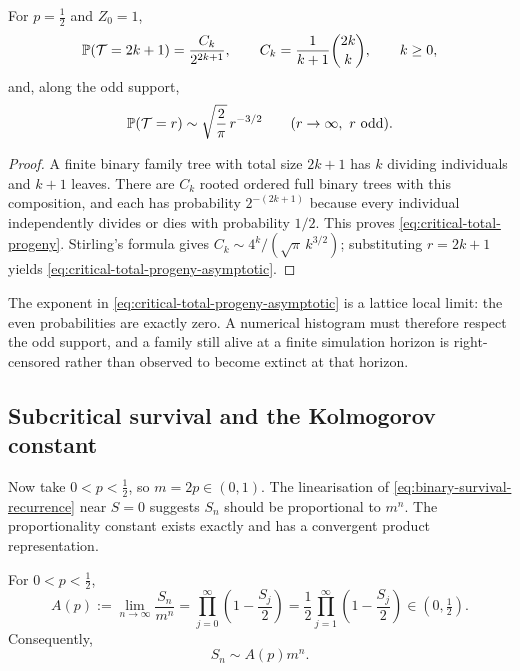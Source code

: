 \begin{proposition}
For $p=\tfrac12$ and $Z_0=1$,
\begin{equation}
  \mathbb{P}(\mathcal{T}=2k+1)
  =\frac{C_k}{2^{2k+1}},
  \qquad
  C_k=\frac{1}{k+1}\binom{2k}{k},
  \qquad k\ge0,
  \label{eq:critical-total-progeny}
\end{equation}
and, along the odd support,
\begin{equation}
  \mathbb{P}(\mathcal{T}=r)
  \sim \sqrt{\frac{2}{\pi}}\,r^{-3/2}
  \qquad (r\to\infty,\ r\text{ odd}).
  \label{eq:critical-total-progeny-asymptotic}
\end{equation}
\end{proposition}

\begin{proof}
A finite binary family tree with total size $2k+1$ has $k$ dividing individuals and $k+1$ leaves.  There are $C_k$ rooted ordered full binary trees with this composition, and each has probability $2^{-(2k+1)}$ because every individual independently divides or dies with probability $1/2$.  This proves \cref{eq:critical-total-progeny}.  Stirling's formula gives $C_k\sim4^k/(\sqrt{\pi}\,k^{3/2})$; substituting $r=2k+1$ yields \cref{eq:critical-total-progeny-asymptotic}.
\end{proof}

The exponent in \cref{eq:critical-total-progeny-asymptotic} is a lattice local limit: the even probabilities are exactly zero.  A numerical histogram must therefore respect the odd support, and a family still alive at a finite simulation horizon is right-censored rather than observed to become extinct at that horizon.

\subsection{Subcritical survival and the Kolmogorov constant}
\label{sec:kolmogorov-constant}

Now take $0<p<\tfrac12$, so $m=2p\in(0,1)$.  The linearisation of \cref{eq:binary-survival-recurrence} near $S=0$ suggests $S_n$ should be proportional to $m^n$.  The proportionality constant exists exactly and has a convergent product representation.

\begin{theorem}
For $0<p<\tfrac12$,
\begin{equation}
  A(p):=\lim_{n\to\infty}\frac{S_n}{m^n}
  =\prod_{j=0}^{\infty}\left(1-\frac{S_j}{2}\right)
  =\frac12\prod_{j=1}^{\infty}
       \left(1-\frac{S_j}{2}\right)
  \in(0,\tfrac12).
  \label{eq:kolmogorov-product}
\end{equation}
Consequently,
\begin{equation}
  S_n\sim A(p)m^n.
  \label{eq:subcritical-survival-asymptotic}
\end{equation}
\end{theorem}

